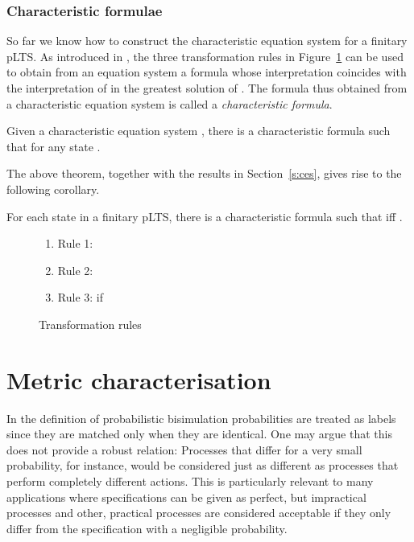 \documentclass{article}
\def\squareforqed{\hbox{\rlap{}}}
\def\qed{\ifmmode\squareforqed\else{\unskip\nobreak\hfil
\penalty50\hskip1em\null\nobreak\hfil\squareforqed
\parfillskip=0pt\finalhyphendemerits=0\endgraf}\fi}
\begin{document}
\subsubsection{Characteristic formulae} So far we know how to
construct the characteristic equation system for a finitary pLTS. As
introduced in \cite{Mul98}, the three transformation rules in
Figure~\ref{f:rules} can be used to obtain from an equation system
 a formula whose interpretation coincides with the interpretation
of  in the greatest solution of . The formula thus obtained
from a characteristic equation system is called a {\em
characteristic formula}.
\begin{theorem}
Given a characteristic equation system , there is a
characteristic formula  such that 
for any state . \hfill\qed
\end{theorem}

The above theorem, together with the results in Section~\ref{s:ces},
gives rise to the following corollary.

\begin{corollary}
For each state  in a finitary pLTS, there is a characteristic
formula  such that  iff .
\hfill\qed
\end{corollary}

\begin{figure}
\begin{enumerate}
\item Rule 1: 
\item Rule 2: 
\item Rule 3:  if 
\end{enumerate}


\caption{Transformation rules}\label{f:rules}
\end{figure}


\section{Metric characterisation}\label{s:metric}
In the definition of probabilistic bisimulation probabilities are
treated as labels since they are matched only when they are
identical. One may argue that this does not provide a robust
relation: Processes that differ for a very small probability, for
instance, would be considered just as different as processes that
perform completely different actions. This is particularly relevant
to many applications where specifications can be given as perfect,
but impractical processes and other, practical processes are
considered acceptable if they only differ from the specification
with a negligible probability.
\end{document}
